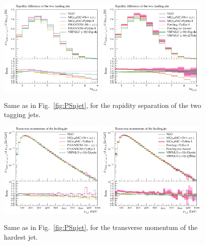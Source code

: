 \begin{figure}[hbt]
\centering
\includegraphics[width=0.47\textwidth]{figures/LOPS/Deltay_jj.pdf}
\includegraphics[width=0.47\textwidth]{figures/NLOPS/Deltay_jj.pdf}
\caption{Same as in Fig.~\protect\ref{fig:PSnjet}, for the rapidity separation of the two tagging jets.}
\label{fig:PSdyjj}
\end{figure}

\begin{figure}[hbt]
\centering
\includegraphics[width=0.47\textwidth]{figures/LOPS/pT_j1.pdf}
\includegraphics[width=0.47\textwidth]{figures/NLOPS/pT_j1.pdf}
\caption{Same as in Fig.~\protect\ref{fig:PSnjet}, for the transverse momentum of the hardest jet.}
\label{fig:PSpt1}
\end{figure}

